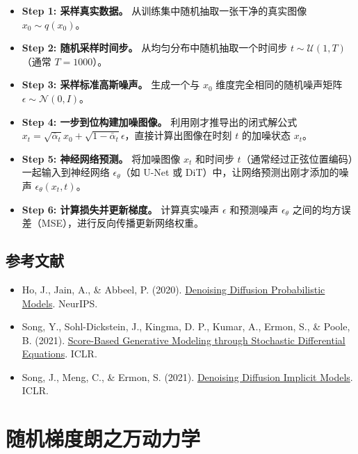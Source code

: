 \begin{itemize}
\tightlist
\item
  \textbf{Step 1: 采样真实数据。} 从训练集中随机抽取一张干净的真实图像 \(x_0\sim q(x_0)\)。
\item
  \textbf{Step 2: 随机采样时间步。} 从均匀分布中随机抽取一个时间步 \(t\sim\mathcal{U}(1,T)\)（通常 \(T=1000\)）。
\item
  \textbf{Step 3: 采样标准高斯噪声。} 生成一个与 \(x_0\) 维度完全相同的随机噪声矩阵 \(\epsilon\sim\mathcal{N}(0,I)\)。
\item
  \textbf{Step 4: 一步到位构建加噪图像。} 利用刚才推导出的闭式解公式 \(x_t=\sqrt{\bar{\alpha}_t}x_0+\sqrt{1-\bar{\alpha}_t}\epsilon\)，直接计算出图像在时刻 \(t\) 的加噪状态 \(x_t\)。
\item
  \textbf{Step 5: 神经网络预测。} 将加噪图像 \(x_t\) 和时间步 \(t\)（通常经过正弦位置编码）一起输入到神经网络 \(\epsilon_\theta\)（如 U-Net 或 DiT）中，让网络预测出刚才添加的噪声 \(\epsilon_\theta(x_t,t)\)。
\item
  \textbf{Step 6: 计算损失并更新梯度。} 计算真实噪声 \(\epsilon\) 和预测噪声 \(\epsilon_\theta\) 之间的均方误差（MSE），进行反向传播更新网络权重。
\end{itemize}

\hypertarget{ux53c2ux8003ux6587ux732e-128}{%
\subsection{参考文献}\label{ux53c2ux8003ux6587ux732e-128}}

\vspace{0.25em}
\begin{itemize}
\tightlist
\item
  Ho, J., Jain, A., \& Abbeel, P. (2020). \href{https://arxiv.org/abs/2006.11239}{Denoising Diffusion Probabilistic Models}. NeurIPS.
\item
  Song, Y., Sohl-Dickstein, J., Kingma, D. P., Kumar, A., Ermon, S., \& Poole, B. (2021). \href{https://arxiv.org/abs/2011.13456}{Score-Based Generative Modeling through Stochastic Differential Equations}. ICLR.
\item
  Song, J., Meng, C., \& Ermon, S. (2021). \href{https://arxiv.org/abs/2010.02502}{Denoising Diffusion Implicit Models}. ICLR.
\end{itemize}

\clearpage

\hypertarget{ux968fux673aux68afux5ea6ux6717ux4e4bux4e07ux52a8ux529bux5b66}{%
\section{随机梯度朗之万动力学}\label{ux968fux673aux68afux5ea6ux6717ux4e4bux4e07ux52a8ux529bux5b66}}

